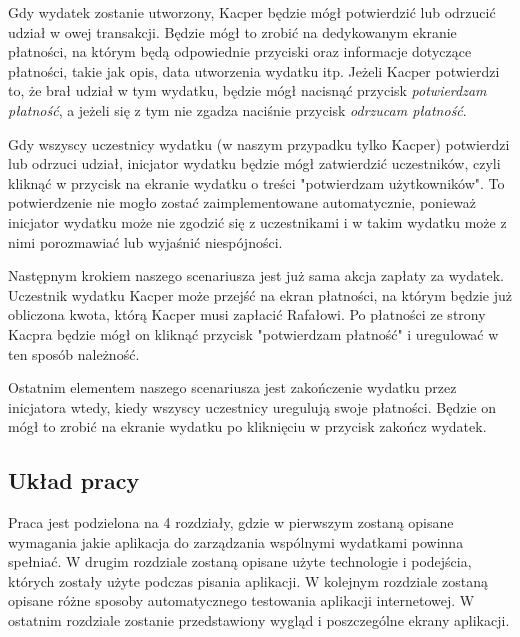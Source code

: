 Gdy wydatek zostanie utworzony, Kacper będzie mógł potwierdzić lub odrzucić udział w owej transakcji. Będzie mógł to zrobić na dedykowanym ekranie płatności, na którym będą odpowiednie przyciski oraz informacje dotyczące płatności, takie jak opis, data utworzenia wydatku itp. Jeżeli Kacper potwierdzi to, że brał udział w tym wydatku, będzie mógł nacisnąć przycisk \emph{potwierdzam płatność}, a jeżeli się z tym nie zgadza naciśnie przycisk \emph{odrzucam płatność}.

Gdy wszyscy uczestnicy wydatku (w naszym przypadku tylko Kacper) potwierdzi lub odrzuci udział, inicjator wydatku będzie mógł zatwierdzić uczestników, czyli kliknąć w przycisk na ekranie wydatku o treści "potwierdzam użytkowników". To potwierdzenie nie mogło zostać zaimplementowane automatycznie, ponieważ inicjator wydatku może nie zgodzić się z uczestnikami i w takim wydatku może z nimi porozmawiać lub wyjaśnić niespójności.

Następnym krokiem naszego scenariusza jest już sama akcja zapłaty za wydatek. Uczestnik wydatku Kacper może przejść na ekran płatności, na którym będzie już obliczona kwota, którą Kacper musi zapłacić Rafałowi. Po płatności ze strony Kacpra będzie mógł on kliknąć przycisk "potwierdzam płatność" i uregulować w ten sposób należność.

Ostatnim elementem naszego scenariusza jest zakończenie wydatku przez inicjatora wtedy, kiedy wszyscy uczestnicy uregulują swoje płatności. Będzie on mógł to zrobić na ekranie wydatku po kliknięciu w przycisk zakończ wydatek.

\subsection{Układ pracy}
Praca jest podzielona na 4 rozdziały, gdzie w pierwszym zostaną opisane wymagania jakie aplikacja do zarządzania wspólnymi wydatkami powinna spełniać. W drugim rozdziale zostaną opisane użyte technologie i podejścia, których zostały użyte podczas pisania aplikacji. W kolejnym rozdziale zostaną opisane różne sposoby automatycznego testowania aplikacji internetowej. W ostatnim rozdziale zostanie przedstawiony wygląd i poszczególne ekrany aplikacji.


